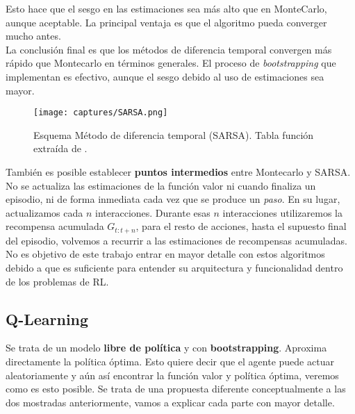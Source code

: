 \documentclass[11pt,fleqn]{book} %
\begin{document}
Esto hace que el sesgo en las estimaciones sea más alto que en MonteCarlo, aunque aceptable. La principal ventaja es que el algoritmo pueda converger mucho antes. \cite{article:DQN2} \\

La conclusión final es que los métodos de diferencia temporal convergen más rápido que Montecarlo en términos generales. El proceso de \textit{bootstrapping} que implementan es efectivo, aunque el sesgo debido al uso de estimaciones sea mayor. \\ 

\newpage

\begin{figure}[H]
	\centering\texttt{[image: captures/SARSA.png]}
	\caption{Esquema Método de diferencia temporal (SARSA). Tabla función extraída de \cite{article:RLromero}.}
	\label{fig:SARSA} %
\end{figure}

También es posible establecer \textbf{puntos intermedios} entre Montecarlo y SARSA. No se actualiza las estimaciones de la función valor ni cuando finaliza un episodio, ni de forma inmediata cada vez que se produce un \textit{paso}. En su lugar, actualizamos cada $n$ interacciones. Durante esas $n$ interacciones utilizaremos la recompensa acumulada $G_{t:t+n}$, para el resto de acciones, hasta el supuesto final del episodio, volvemos a recurrir a las estimaciones de recompensas acumuladas. \\

No es objetivo de este trabajo entrar en mayor detalle con estos algoritmos debido a que es suficiente para entender su arquitectura y funcionalidad dentro de los problemas de RL. \\

\subsection{Q-Learning}\label{sec:qlearning}

Se trata de un modelo \textbf{libre de política} y con \textbf{bootstrapping}. Aproxima directamente la política óptima. Esto quiere decir que el agente puede actuar aleatoriamente y aún así encontrar la función valor y política óptima, veremos como es esto posible. Se trata de una propuesta diferente conceptualmente a las dos mostradas anteriormente, vamos a explicar cada parte con mayor detalle. \\
\end{document}
